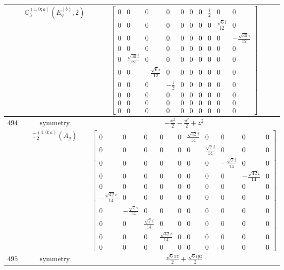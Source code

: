 \documentclass[fleqn,8pt,landscape]{jsarticle}
\begin{document}
\begin{longtable}{ccc}
$  $ & $ \mathbb{G}_{3}^{(1,0;a)}(E_{g}^{(b)},2) $ & $ \begin{bmatrix} 0 & 0 & 0 & 0 & 0 & 0 & 0 & \frac{i}{2} & 0 & 0 \\ 0 & 0 & 0 & 0 & 0 & 0 & 0 & 0 & \frac{\sqrt{6} i}{12} & 0 \\ 0 & 0 & 0 & 0 & 0 & 0 & 0 & 0 & 0 & - \frac{\sqrt{30} i}{12} \\ 0 & 0 & 0 & 0 & 0 & 0 & 0 & 0 & 0 & 0 \\ 0 & \frac{\sqrt{30} i}{12} & 0 & 0 & 0 & 0 & 0 & 0 & 0 & 0 \\ 0 & 0 & - \frac{\sqrt{6} i}{12} & 0 & 0 & 0 & 0 & 0 & 0 & 0 \\ 0 & 0 & 0 & - \frac{i}{2} & 0 & 0 & 0 & 0 & 0 & 0 \\ 0 & 0 & 0 & 0 & 0 & 0 & 0 & 0 & 0 & 0 \\ 0 & 0 & 0 & 0 & 0 & 0 & 0 & 0 & 0 & 0 \\ 0 & 0 & 0 & 0 & 0 & 0 & 0 & 0 & 0 & 0 \end{bmatrix} $ \\ \hline
$ 494 $ & $ \text{symmetry} $ & $ - \frac{x^{2}}{2} - \frac{y^{2}}{2} + z^{2} $ \\
$  $ & $ \mathbb{T}_{2}^{(1,0;a)}(A_{g}) $ & $ \begin{bmatrix} 0 & 0 & 0 & 0 & 0 & \frac{\sqrt{42} i}{14} & 0 & 0 & 0 & 0 \\ 0 & 0 & 0 & 0 & 0 & 0 & \frac{\sqrt{7} i}{14} & 0 & 0 & 0 \\ 0 & 0 & 0 & 0 & 0 & 0 & 0 & - \frac{\sqrt{7} i}{14} & 0 & 0 \\ 0 & 0 & 0 & 0 & 0 & 0 & 0 & 0 & - \frac{\sqrt{42} i}{14} & 0 \\ 0 & 0 & 0 & 0 & 0 & 0 & 0 & 0 & 0 & 0 \\ - \frac{\sqrt{42} i}{14} & 0 & 0 & 0 & 0 & 0 & 0 & 0 & 0 & 0 \\ 0 & - \frac{\sqrt{7} i}{14} & 0 & 0 & 0 & 0 & 0 & 0 & 0 & 0 \\ 0 & 0 & \frac{\sqrt{7} i}{14} & 0 & 0 & 0 & 0 & 0 & 0 & 0 \\ 0 & 0 & 0 & \frac{\sqrt{42} i}{14} & 0 & 0 & 0 & 0 & 0 & 0 \\ 0 & 0 & 0 & 0 & 0 & 0 & 0 & 0 & 0 & 0 \end{bmatrix} $ \\ \hline
$ 495 $ & $ \text{symmetry} $ & $ \frac{\sqrt{6} x z}{2} + \frac{\sqrt{6} i y z}{2} $ \\

\end{longtable}
\end{document}
